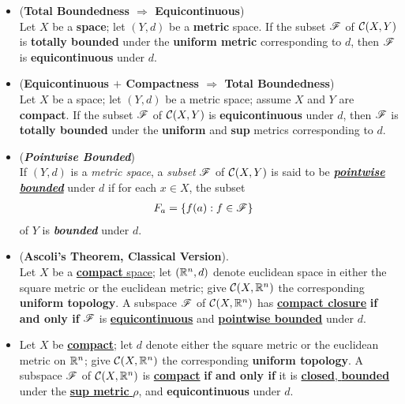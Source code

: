 \documentclass[11pt]{article}
\begin{document}
\begin{itemize}
\item \begin{lemma} (\textbf{Total Boundedness $\Rightarrow$ Equicontinuous}) \citep{munkres2000topology}\\ 
Let $X$ be a \textbf{space}; let $(Y, d)$ be a \textbf{metric} space. If the subset ${\mathscr F}$ of ${\mathcal C}(X, Y)$ is \textbf{totally bounded} under the \textbf{uniform metric} corresponding to $d$, then ${\mathscr F}$ is \textbf{equicontinuous} under $d$.
\end{lemma}

\item \begin{lemma} (\textbf{Equicontinuous $+$ Compactness  $\Rightarrow$ Total Boundedness})  \citep{munkres2000topology}\\ 
Let $X$ be a space; let $(Y, d)$ be a metric space; assume $X$ and $Y$ are \textbf{compact}. If the subset ${\mathscr F}$ of ${\mathcal C}(X, Y)$ is \textbf{equicontinuous} under $d$, then ${\mathscr F}$ is \textbf{totally bounded} under the \textbf{uniform} and \textbf{sup} metrics corresponding to $d$.
\end{lemma}

\item \begin{definition} (\emph{\textbf{Pointwise Bounded}})\\
If $(Y, d)$ is a \emph{metric space}, a \emph{subset} ${\mathscr F}$ of ${\mathcal C}(X, Y)$ is said to be \underline{\emph{\textbf{pointwise bounded}}} under $d$ if for each $x \in X$, the subset
\begin{align*}
F_{a} &= \left\{f(a): f\in {\mathscr F}\right\}
\end{align*}
of $Y$ is \emph{\textbf{bounded}} under $d$.
\end{definition}

\item \begin{theorem} (\textbf{Ascoli's Theorem, Classical Version}). \citep{munkres2000topology}\\
Let $X$ be a \underline{\textbf{compact} space}; let $({\mathbb R}^n , d)$ denote euclidean space in either the square metric or the euclidean metric; give ${\mathcal C}(X, {\mathbb R}^n)$ the corresponding \textbf{uniform topology}. A subspace ${\mathscr F}$ of ${\mathcal C}(X, {\mathbb R}^n)$ has \underline{\textbf{compact closure}} \textbf{if and only if} ${\mathscr F}$ is \underline{\textbf{equicontinuous}} and \underline{\textbf{pointwise bounded}} under $d$.
\end{theorem}



\item \begin{corollary}
Let $X$  be  \underline{\textbf{compact}}; let $d$ denote either the square metric or the euclidean metric on ${\mathbb R}^n$; give ${\mathcal C}(X, {\mathbb R}^n)$ the corresponding \textbf{uniform topology}. A subspace ${\mathscr F}$ of ${\mathcal C}(X, {\mathbb R}^n)$ is \underline{\textbf{compact}} \textbf{if and only if} it is \underline{\textbf{closed}, \textbf{bounded}} under the \underline{\textbf{sup metric} $\rho$}, and \textbf{equicontinuous} under $d$.
\end{corollary}


\end{itemize}
\end{document}
